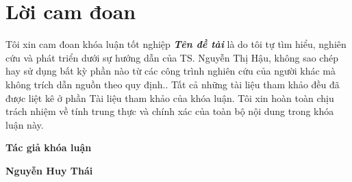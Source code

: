 \clearpage
{}

\chapter*{Lời cam đoan}

Tôi xin cam đoan khóa luận tốt nghiệp \textit{\textbf{Tên đề tài}} là do tôi tự tìm hiểu, nghiên cứu và phát triển dưới sự hướng dẫn của TS. Nguyễn Thị Hậu, không sao chép hay sử dụng bất kỳ phần nào từ các công trình nghiên cứu của người khác mà không trích dẫn nguồn theo quy định.. Tất cả những tài liệu tham khảo đều đã được liệt kê ở phần Tài liệu tham khảo của khóa luận. Tôi xin hoàn toàn chịu trách nhiệm về tính trung thực và chính xác của toàn bộ nội dung trong khóa luận này.

\vspace{1cm}

\hspace{9.4cm}\textbf{Tác giả khóa luận}
\vspace{2.5cm}

\hspace{9.3cm}\textbf{Nguyễn Huy Thái}


